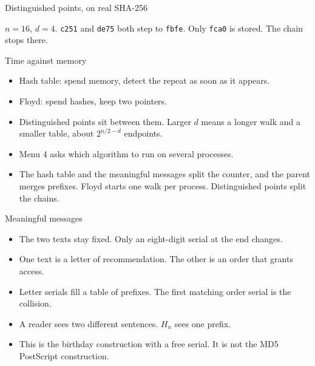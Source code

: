 \documentclass[aspectratio=169,11pt]{beamer}
\newcommand{\Hn}{H_{n}}
\begin{document}
\begin{frame}{Distinguished points, on real SHA-256}
  \begin{center}
  \end{center}
  \vspace{-0.3em}
  {\scriptsize \(n = 16\), \(d = 4\). \texttt{c251} and \texttt{de75} both step to \texttt{fbfe}. Only \texttt{fca0} is stored. The chain stops there.}
\end{frame}

\begin{frame}{Time against memory}
  \begin{itemize}
    \item Hash table: spend memory, detect the repeat as soon as it appears.
    \item Floyd: spend hashes, keep two pointers.
    \item Distinguished points sit between them. Larger \(d\) means a longer walk and a smaller table, about \(2^{n/2 - d}\) endpoints.
    \item Menu 4 asks which algorithm to run on several processes.
    \item The hash table and the meaningful messages split the counter, and the parent merges prefixes. Floyd starts one walk per process. Distinguished points split the chains.
  \end{itemize}
\end{frame}

\begin{frame}{Meaningful messages}
  \begin{itemize}
    \item The two texts stay fixed. Only an eight-digit serial at the end changes.
    \item One text is a letter of recommendation. The other is an order that grants access.
    \item Letter serials fill a table of prefixes. The first matching order serial is the collision.
    \item A reader sees two different sentences. \(\Hn\) sees one prefix.
    \item This is the birthday construction with a free serial. It is not the MD5 PostScript construction.
  \end{itemize}
\end{frame}
\end{document}
